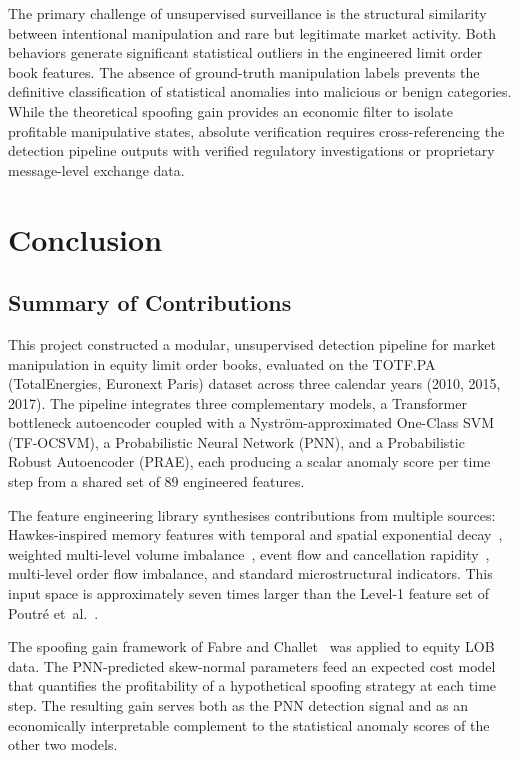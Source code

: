 \documentclass[11pt]{report}
\begin{document}
The primary challenge of unsupervised surveillance is the structural similarity between intentional manipulation and rare but legitimate market activity. Both behaviors generate significant statistical outliers in the engineered limit order book features. The absence of ground-truth manipulation labels prevents the definitive classification of statistical anomalies into malicious or benign categories. While the theoretical spoofing gain provides an economic filter to isolate profitable manipulative states, absolute verification requires cross-referencing the detection pipeline outputs with verified regulatory investigations or proprietary message-level exchange data.


\chapter{Conclusion}\label{chap:conclusion}

\section{Summary of Contributions}\label{sec:conclusion:summary}

This project constructed a modular, unsupervised detection pipeline for market manipulation in equity limit order books, evaluated on the TOTF.PA (TotalEnergies, Euronext Paris) dataset across three calendar years (2010, 2015, 2017). The pipeline integrates three complementary models, a Transformer bottleneck autoencoder coupled with a Nystr\"om-approximated One-Class SVM (TF-OCSVM), a Probabilistic Neural Network (PNN), and a Probabilistic Robust Autoencoder (PRAE), each producing a scalar anomaly score per time step from a shared set of 89 engineered features.

The feature engineering library synthesises contributions from multiple sources: Hawkes-inspired memory features with temporal and spatial exponential decay~\cite{fabre_2025}, weighted multi-level volume imbalance~\cite{tao_2020}, event flow and cancellation rapidity~\cite{poutre_2024}, multi-level order flow imbalance, and standard microstructural indicators. This input space is approximately seven times larger than the Level-1 feature set of Poutr\'e et~al.~\cite{poutre_2024}.

The spoofing gain framework of Fabre and Challet~\cite{fabre_2025} was applied to equity LOB data. The PNN-predicted skew-normal parameters feed an expected cost model that quantifies the profitability of a hypothetical spoofing strategy at each time step. The resulting gain serves both as the PNN detection signal and as an economically interpretable complement to the statistical anomaly scores of the other two models.
\end{document}
